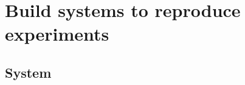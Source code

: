 \documentclass[nomenclature, english, bibtex]{kththesis}
\newcommand*{\warningExpl}[1]{\todo[inline, backgroundcolor=kth-lightred40]{#1}} %
\begin{document}
\cleardoublepage
\renewcommand{\bibname}{References}

\ifbiblatex
    \printbibliography[heading=bibintoc]
\else
    
\fi



\cleardoublepage
\appendix
\renewcommand{\chaptermark}[1]{\markboth{Appendix \thechapter\relax:\thinspace\relax#1}{}}

\chapter{Build systems to reproduce experiments}
\label{sec:buildSystems}


\section{System}
\end{document}
